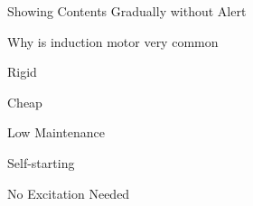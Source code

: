 \documentclass[aspectratio=169, xcolor={x11names}]{beamer}
\begin{document}
\begin{frame}{Showing Contents Gradually without Alert}

    \begin{block}{Why is induction motor very common}
        \uncover<+->{\vphantom{$1$}}

        \begin{description}[<+->]
            \item[Rigid] Rigid
            \item[Cheap] Cheap
            \item[Low Maintenance] Low Maintenance
            \item[Self-Starting] Self-starting
            \item[No Excitation Needed] No Excitation Needed
        \end{description}

    \end{block}


\end{frame}
\end{document}
